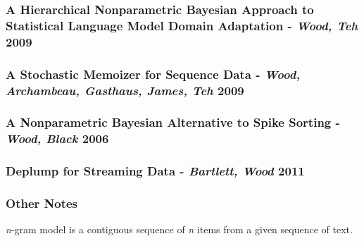 \subsubsection{A Hierarchical Nonparametric Bayesian Approach to Statistical Language Model Domain Adaptation - \textit{Wood, Teh} 2009}

\subsubsection{A Stochastic Memoizer for Sequence Data - \textit{Wood, Archambeau, Gasthaus, James, Teh} 2009}

\subsubsection{A Nonparametric Bayesian Alternative to Spike Sorting - \textit{Wood, Black} 2006}

\subsubsection{Deplump for Streaming Data - \textit{Bartlett, Wood} 2011}


\subsubsection{Other Notes}

\textit{n}-gram model is a contiguous sequence of \textit{n} items from a given sequence of text.

